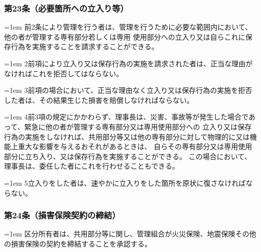 \documentclass[
  luatex,
  paper=a4paper,
  fontsize=11pt,
  jafontsize=11pt,
  jlreq_notes,
]{jlreq}
\newcommand{\joumain}[1]{%
  \noindent\hangindent=1em\hangafter=1
  \hspace{1em}#1%
}
\newcommand{\kou}[2]{%
  \par\noindent\hangindent=1em\hangafter=1
  #1\hspace{1em}#2%
}
\begin{document}
  \subsubsection*{第23条（必要箇所への立入り等）}
  \joumain{前2条により管理を行う者は、管理を行うために必要な範囲内において、他の者が管理する専有部分若しくは専用
  使用部分への立入り又は自らこれに保存行為を実施することを請求することができる。}
  \kou{2}{前項により立入り又は保存行為の実施を請求された者は、正当な理由がなければこれを拒否してはならない。}
  \kou{3}{前項の場合において、正当な理由なく立入り又は保存行為の実施を拒否した者は、その結果生じた損害を賠償しなければならない。}
  \kou{4}{前3項の規定にかかわらず、理事長は、災害、事故等が発生した場合であって、緊急に他の者が管理する専有部分又は専用使用部分への
  立入り又は保存行為の実施をしなければ、共用部分等又は他の専有部分に対して物理的に又は機能上重大な影響を与えるおそれがあるときは、
  自らその専有部分又は専用使用部分に立ち入り、又は保存行為を実施することができる。
  この場合において、理事長は、委任した者にこれを行わせることもできる。}
  \kou{5}{立入りをした者は、速やかに立入りをした箇所を原状に復さなければならない。}

  \subsubsection*{第24条（損害保険契約の締結）}
  \joumain{区分所有者は、共用部分等に関し、管理組合が火災保険、地震保険その他の損害保険の契約を締結することを承認する。}
\end{document}
